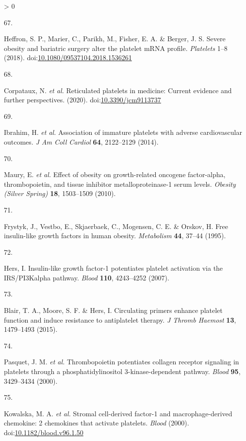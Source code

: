\documentclass[11pt,twoside]{bristolthesis}
\newlength{\cslhangindent}
\newlength{\csllabelwidth}
\newenvironment{CSLReferences}[2] %
 {%
  \setlength{\parindent}{0pt}
  \ifodd #1 \everypar{\setlength{\hangindent}{\cslhangindent}}\ignorespaces\fi
  \ifnum #2 > 0
  \setlength{\parskip}{#2\baselineskip}
  \fi
 }%
 {}
\newcommand{\CSLLeftMargin}[1]{\parbox[t]{\csllabelwidth}{#1}}
\newcommand{\CSLRightInline}[1]{\parbox[t]{\linewidth - \csllabelwidth}{#1}\break}
\begin{document}
\begin{CSLReferences}{0}{0}
\leavevmode\hypertarget{ref-Heffron2018}{}%
\CSLLeftMargin{67. }
\CSLRightInline{Heffron, S. P., Marier, C., Parikh, M., Fisher, E. A. \& Berger, J. S. {Severe obesity and bariatric surgery alter the platelet mRNA profile}. \emph{Platelets} 1--8 (2018). doi:\href{https://doi.org/10.1080/09537104.2018.1536261}{10.1080/09537104.2018.1536261}}

\leavevmode\hypertarget{ref-Corpataux2020}{}%
\CSLLeftMargin{68. }
\CSLRightInline{Corpataux, N. \emph{et al.} {Reticulated platelets in medicine: Current evidence and further perspectives}. (2020). doi:\href{https://doi.org/10.3390/jcm9113737}{10.3390/jcm9113737}}

\leavevmode\hypertarget{ref-Ibrahim2014}{}%
\CSLLeftMargin{69. }
\CSLRightInline{Ibrahim, H. \emph{et al.} {Association of immature platelets with adverse cardiovascular outcomes}. \emph{J Am Coll Cardiol} \textbf{64}, 2122--2129 (2014).}

\leavevmode\hypertarget{ref-Maury2010a}{}%
\CSLLeftMargin{70. }
\CSLRightInline{Maury, E. \emph{et al.} {Effect of obesity on growth-related oncogene factor-alpha, thrombopoietin, and tissue inhibitor metalloproteinase-1 serum levels}. \emph{Obesity (Silver Spring)} \textbf{18}, 1503--1509 (2010).}

\leavevmode\hypertarget{ref-Frystyk1995}{}%
\CSLLeftMargin{71. }
\CSLRightInline{Frystyk, J., Vestbo, E., Skjaerbaek, C., Mogensen, C. E. \& Orskov, H. {Free insulin-like growth factors in human obesity}. \emph{Metabolism} \textbf{44}, 37--44 (1995).}

\leavevmode\hypertarget{ref-Hers2007}{}%
\CSLLeftMargin{72. }
\CSLRightInline{Hers, I. {Insulin-like growth factor-1 potentiates platelet activation via the IRS/PI3Kalpha pathway}. \emph{Blood} \textbf{110}, 4243--4252 (2007).}

\leavevmode\hypertarget{ref-Blair2015}{}%
\CSLLeftMargin{73. }
\CSLRightInline{Blair, T. A., Moore, S. F. \& Hers, I. {Circulating primers enhance platelet function and induce resistance to antiplatelet therapy}. \emph{J Thromb Haemost} \textbf{13}, 1479--1493 (2015).}

\leavevmode\hypertarget{ref-Pasquet2000}{}%
\CSLLeftMargin{74. }
\CSLRightInline{Pasquet, J. M. \emph{et al.} {Thrombopoietin potentiates collagen receptor signaling in platelets through a phosphatidylinositol 3-kinase-dependent pathway}. \emph{Blood} \textbf{95}, 3429--3434 (2000).}

\leavevmode\hypertarget{ref-Kowalska2000}{}%
\CSLLeftMargin{75. }
\CSLRightInline{Kowalska, M. A. \emph{et al.} {Stromal cell-derived factor-1 and macrophage-derived chemokine: 2 chemokines that activate platelets}. \emph{Blood} (2000). doi:\href{https://doi.org/10.1182/blood.v96.1.50}{10.1182/blood.v96.1.50}}


\end{CSLReferences}
\end{document}
